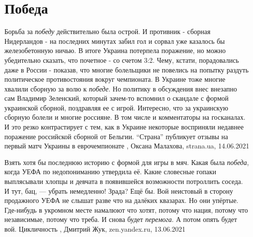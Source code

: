  
 
 
 
 
\chapter{Победа}

Борьба за \emph{победу} действительно была острой. И противник - сборная Нидерландов -
на последних минутах забил гол и сорвал уже казалось бы железобетонную ничью.
В итоге Украина потерпела поражение, но можно убедительно сказать, что почетное
- со счетом 3:2. Чему, кстати, порадовались даже в России - показав, что многие
болельщики не повелись на попытку раздуть политическое противостояния вокруг
чемпионата. В Украине тоже многие хвалили сборную за волю к \emph{победе}. Но
политику в обсуждения внес внезапно сам Владимир Зеленский, который зачем-то
вспомнил о скандале с формой украинской сборной, поздравляя ее с игрой.
Интересно, что за украинскую сборную болели и многие россияне. В том числе и
комментаторы на госканалах. И это резко контрастирует с тем, как в Украине
некоторые восприняли недавнее поражение российской сборной от Бельгии.
\enquote{Страна} публикует отзывы на первый матч Украины в еврочемпионате
, 
Оксана Малахова, strana.ua, 14.06.2021

Взять хотя бы последнюю историю с формой для игры в мяч. Какая была \emph{победа},
когда УЕФА по недопониманию утвердила её. Какие словесные гопаки выплясывали
хлопцы и девчата в появившейся возможности потроллить соседа. И тут, бац, —
убрать немедленно! Зрада? Ещё бы. Вой неистовый в сторону продажного УЕФА не
слышат разве что на далёких квазарах. Но они упёртые. Где-нибудь в укромном
месте намалюют что хотят, потому что нация, потому что независимые, потому что
треба. И снова будет \emph{перемога}. А потом опять будет вой. Цикличность
, 
Дмитрий Жук, zen.yandex.ru, 13.06.2021 

